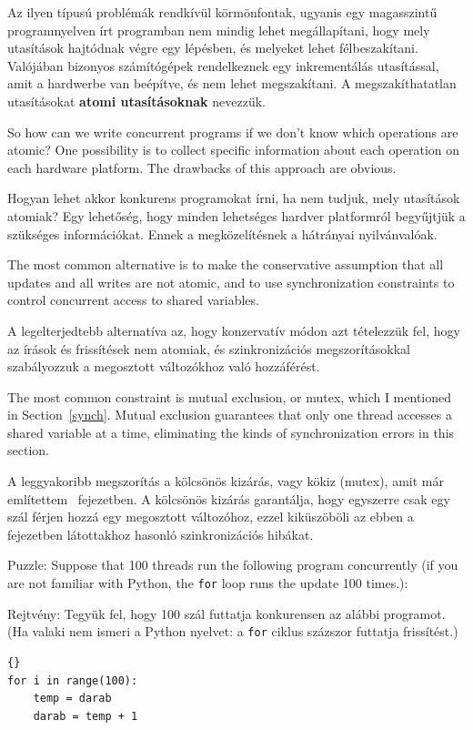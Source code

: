 \documentclass{book}
\begin{document}
Az ilyen típusú problémák rendkívül körmönfontak, ugyanis
egy magasszintű programnyelven írt programban nem mindig
lehet megállapítani, hogy mely utasítások hajtódnak végre
egy lépésben, és melyeket lehet félbeszakítani. Valójában
bizonyos számítógépek rendelkeznek egy inkrementálás
utasítással, amit a hardwerbe van beépítve, és nem lehet
megszakítani. A megszakíthatatlan utasításokat {\bf atomi
utasításoknak} nevezzük.

So how can we write concurrent programs if we don't know which
operations are atomic?  One possibility is to collect specific
information about each operation on each hardware platform.
The drawbacks of this approach are obvious.

Hogyan lehet akkor konkurens programokat írni, ha nem tudjuk,
mely utasítások atomiak? Egy lehetőség, hogy minden lehetséges hardver
platformról begyűjtjük a szükséges információkat. Ennek a
megközelítésnek a hátrányai nyilvánvalóak.

The most common alternative is to make the conservative
assumption that all updates and all writes are not atomic,
and to use synchronization constraints to control concurrent
access to shared variables.

A legelterjedtebb alternatíva az, hogy konzervatív módon
azt tételezzük fel, hogy az írások és frissítések nem atomiak,
és szinkronizációs megszorításokkal szabályozzuk a megosztott
változókhoz való hozzáférést.

The most common constraint is mutual exclusion, or mutex,
which I mentioned in Section~\ref{synch}.  Mutual exclusion guarantees
that only one thread accesses a shared variable at a time,
eliminating the kinds of synchronization errors in this section.

A leggyakoribb megszorítás a kölcsönös kizárás, vagy kökiz (mutex),
amit már említettem ~fejezetben. A kölcsönös kizárás
garantálja, hogy egyszerre csak egy szál férjen hozzá egy megosztott
változóhoz, ezzel kiküszöböli az ebben a fejezetben látottakhoz hasonló
szinkronizációs hibákat.

Puzzle: Suppose that 100 threads run the following program concurrently
(if you are not familiar with Python, the {\tt for} loop runs the update
100 times.):

Rejtvény: Tegyük fel, hogy 100 szál futtatja konkurensen az alábbi
programot. (Ha valaki nem ismeri a Python nyelvet: a {\tt for} ciklus
százszor futtatja frissítést.)

\begin{lstlisting}[]{}
for i in range(100):
    temp = darab
    darab = temp + 1
\end{lstlisting}
\end{document}
